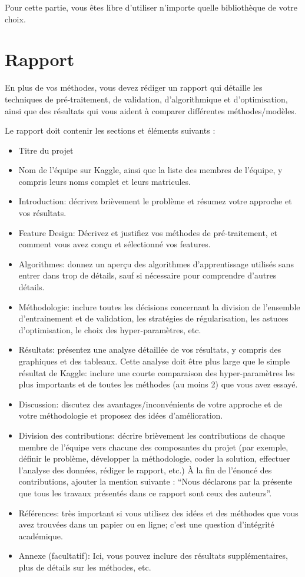 \documentclass[12pt]{article}
\begin{document}
Pour cette partie, vous êtes libre d'utiliser n'importe quelle bibliothèque de votre choix. 

\section{Rapport}
\label{sec:report}

En plus de vos méthodes, vous devez rédiger un rapport qui détaille les techniques de pré-traitement, de validation, d'algorithmique et d'optimisation, ainsi que des résultats qui vous aident à comparer différentes méthodes/modèles.

Le rapport doit contenir les sections et éléments suivants :

\begin{itemize}
  \item Titre du projet
  \item Nom de l'équipe sur Kaggle, ainsi que la liste des membres de l'équipe, y compris leurs noms complet et leurs matricules.
  \item Introduction: décrivez brièvement le problème et résumez votre approche et vos résultats.
  \item Feature Design: Décrivez et justifiez vos méthodes de pré-traitement, et comment vous avez conçu et sélectionné vos features.
  \item Algorithmes: donnez un aperçu des algorithmes d'apprentissage utilisés sans entrer dans trop de détails, sauf si nécessaire pour comprendre d'autres détails.
  \item Méthodologie: inclure toutes les décisions concernant la division de l'ensemble d'entrainement et de validation, les stratégies de régularisation, les astuces d'optimisation, le choix des hyper-paramètres, etc.
  \item Résultats: présentez une analyse détaillée de vos résultats, y compris des graphiques et des tableaux. Cette analyse doit être plus large que le simple résultat de Kaggle: inclure une courte comparaison des hyper-paramètres les plus importants et de toutes les méthodes (au moins 2) que vous avez essayé.
  \item Discussion: discutez des avantages/inconvénients de votre approche et de votre méthodologie et proposez des idées d'amélioration.
  \item Division des contributions: décrire brièvement les contributions de chaque membre de l'équipe vers chacune des composantes du projet (par exemple, définir le problème, développer la méthodologie, coder la solution, effectuer l'analyse des données, rédiger le rapport, etc.) À la fin de l'énoncé des contributions, ajouter la mention suivante : ``Nous déclarons par la présente que tous les travaux présentés dans ce rapport sont ceux des auteurs''.
  \item Références: très important si vous utilisez des idées et des méthodes que vous avez trouvées dans un papier ou en ligne; c'est une question d'intégrité académique.
  \item Annexe (facultatif): Ici, vous pouvez inclure des résultats supplémentaires, plus de détails sur les méthodes, etc.
  \end{itemize} 
  
\end{document}
